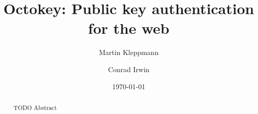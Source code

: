 \documentclass{article}
\begin{document}
\title{Octokey: Public key authentication for the web}
\author{Martin Kleppmann \and Conrad Irwin}
\date{\today}
\maketitle

\begin{abstract}
TODO Abstract
\end{abstract}






{}

\end{document}
